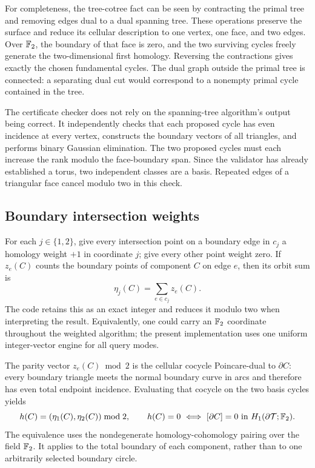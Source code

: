 For completeness, the tree-cotree fact can be seen by contracting the primal
tree and removing edges dual to a dual spanning tree. These operations
preserve the surface and reduce its cellular description to one vertex,
one face, and two edges. Over $\mathbb F_2$, the boundary of that face is zero,
and the two surviving cycles freely generate the two-dimensional first
homology. Reversing the contractions gives exactly the chosen fundamental
cycles. The dual graph outside the primal tree is connected: a separating
dual cut would correspond to a nonempty primal cycle contained in the tree.

The certificate checker does not rely on the spanning-tree algorithm's output
being correct. It independently checks that each proposed cycle has even
incidence at every vertex, constructs the boundary vectors of all triangles,
and performs binary Gaussian elimination. The two proposed cycles must each
increase the rank modulo the face-boundary span. Since the validator has
already established a torus, two independent classes are a basis. Repeated
edges of a triangular face cancel modulo two in this check.

\subsection{Boundary intersection weights}

For each $j\in\{1,2\}$, give every intersection point on a boundary edge in
$c_j$ a homology weight $+1$ in coordinate $j$; give every other point weight
zero. If $z_e(C)$ counts the boundary points of component $C$ on edge $e$, then
its orbit sum is
\[
                    \eta_j(C)=\sum_{e\in c_j} z_e(C).
\]
The code retains this as an exact integer and reduces it modulo two when
interpreting the result. Equivalently, one could carry an $\mathbb F_2$ coordinate
throughout the weighted algorithm; the present implementation uses one
uniform integer-vector engine for all query modes.

The parity vector $z_e(C)\bmod2$ is the cellular cocycle Poincare-dual to
$\partial C$: every boundary triangle meets the normal boundary curve in
arcs and therefore has even total endpoint incidence. Evaluating that cocycle
on the two basis cycles yields
\[
    h(C)=(\eta_1(C),\eta_2(C))\bmod2,
    \qquad
    h(C)=0\ \Longleftrightarrow\ [\partial C]=0
       \text{ in }H_1(\partial\mathcal T;\mathbb F_2).
\]
The equivalence uses the nondegenerate homology-cohomology pairing over the
field $\mathbb F_2$. It applies to the total boundary of each component, rather than
to one arbitrarily selected boundary circle.

